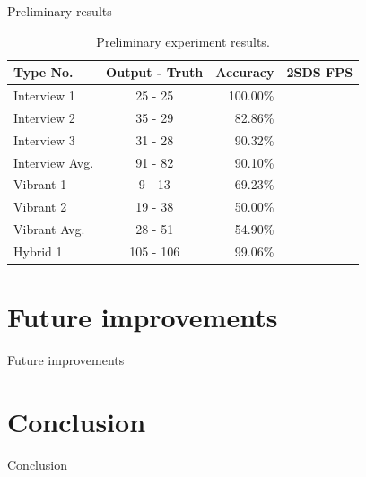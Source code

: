 \documentclass[aspectratio=43,display]{beamer}
\begin{document}
		\begin{frame}{Preliminary results}

			\begin{table}
				\centering
				\begin{tabular}{l c r r}
					\hline
					Type No. & Output - Truth & Accuracy & 2SDS FPS  \\
					\hline
					Interview 1 & 25 - 25 & 100.00\% & \\
					Interview 2 & 35 - 29 & 82.86\% & \\
					Interview 3 & 31 - 28 & 90.32\% & \\
					Interview Avg. & 91 - 82 & 90.10\% & \\
					\hline
					Vibrant 1 & 9 - 13 & 69.23\% & \\
					Vibrant 2 & 19 - 38 & 50.00\% & \\
					Vibrant Avg. & 28 - 51 & 54.90\% & \\
					\hline
					Hybrid 1 & 105 - 106 & 99.06\% & \\
					\hline
				\end{tabular}
			\caption{\label{tab:Results}Preliminary experiment results.}
			\end{table}

		\end{frame}


	\section{Future improvements}

		\begin{frame}{Future improvements}



		\end{frame}


	\section{Conclusion}

		\begin{frame}{Conclusion}



		\end{frame}
\end{document}
